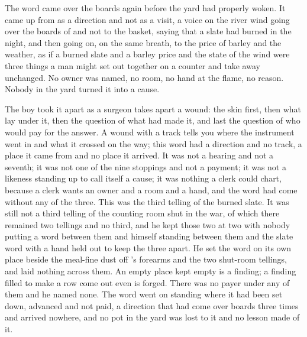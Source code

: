 \scenebreak

The word came over the boards again before the yard had properly woken. It came up from  as a direction and not as a visit, a voice on the river wind going over the boards of  and not to the basket, saying that a slate had burned in the night, and then going on, on the same breath, to the price of barley and the weather, as if a burned slate and a barley price and the state of the wind were three things a man might set out together on a counter and take away unchanged. No owner was named, no room, no hand at the flame, no reason. Nobody in the yard turned it into a cause.

The boy took it apart as a surgeon takes apart a wound: the skin first, then what lay under it, then the question of what had made it, and last the question of who would pay for the answer. A wound with a track tells you where the instrument went in and what it crossed on the way; this word had a direction and no track, a place it came from and no place it arrived. It was not a hearing and not a seventh; it was not one of the nine stoppings and not a payment; it was not a likeness standing up to call itself a cause; it was nothing a clerk could chart, because a clerk wants an owner and a room and a hand, and the word had come without any of the three. This was the third telling of the burned slate. It was still not a third telling of the counting room shut in the war, of which there remained two tellings and no third, and he kept those two at two with nobody putting a word between them and himself standing between them and the slate word with a hand held out to keep the three apart. He set the word on its own place beside the meal-fine dust off 's forearms and the two shut-room tellings, and laid nothing across them. An empty place kept empty is a finding; a finding filled to make a row come out even is forged. There was no payer under any of them and he named none. The word went on standing where it had been set down, advanced and not paid, a direction that had come over boards three times and arrived nowhere, and no pot in the yard was lost to it and no lesson made of it.

\scenebreak

